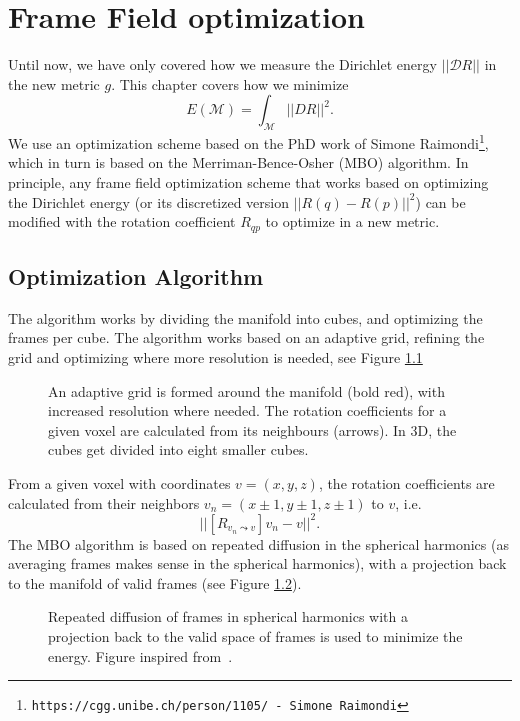 \documentclass[../thesis.tex]{subfiles}
\begin{document}
\chapter{Frame Field optimization}
\label{ch:optimization}
Until now, we have only covered how we measure the Dirichlet energy $||\mathcal{D}R||$ in
the new metric $g$.
This chapter covers how we minimize
$$E(\mathcal{M})=\int_{\mathcal{M}}||DR||^2.$$
We use an optimization scheme based on the PhD work of Simone Raimondi\footnote{\texttt{https://cgg.unibe.ch/person/1105/ - Simone Raimondi}}, which in turn is based
on the Merriman-Bence-Osher (MBO) algorithm.
In principle, any frame field optimization scheme that works based on
optimizing the Dirichlet energy (or its discretized version $||R(q)-R(p)||^2$) can be
modified with the rotation coefficient $R_{qp}$ to optimize in a new metric.
\section{Optimization Algorithm}
The algorithm works by dividing the manifold into cubes,
and optimizing the frames per cube. The algorithm works based on an adaptive
grid, refining the grid and optimizing where more resolution is needed, see Figure \ref{fig:grid} 
\begin{figure}[htb]
    \centering
    \def\svgwidth{20em}
    
    \caption{An adaptive grid is formed around the manifold (bold red), with increased resolution where needed.
    The rotation coefficients for a given voxel are calculated from its neighbours (arrows).
    In 3D, the cubes get divided into eight smaller cubes.}
    \label{fig:grid}
\end{figure}
From a given voxel with coordinates $v=(x,y,z)$, the rotation coefficients
are calculated from their neighbors $v_n=(x\pm 1,y\pm 1,z\pm 1)$ to $v$,
i.e. $$||[R_{v_n\leadsto v}]v_n - v||^2.$$
The MBO algorithm is based on repeated diffusion in the spherical harmonics (as averaging frames
makes sense in the spherical harmonics), with a projection back to the manifold
of valid frames (see Figure \ref{fig:diffusionprojection}).
\begin{figure}[htb]
    \centering
    \def\svgwidth{20em}
    
    \caption{Repeated diffusion of frames in spherical harmonics with a projection back to the
    valid space of frames is used to minimize the energy. Figure inspired from~\cite{Palmer}. }
    \label{fig:diffusionprojection}
\end{figure}
\end{document}

